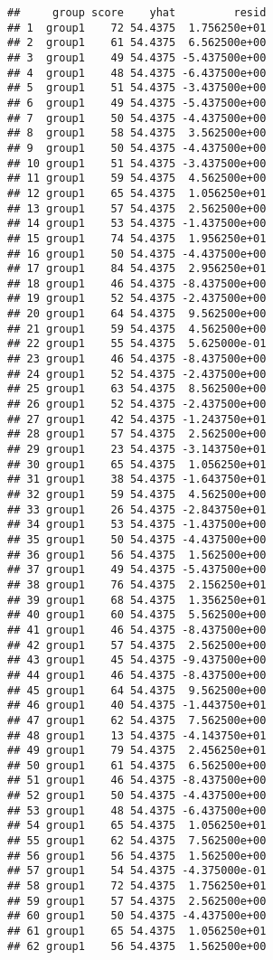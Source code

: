 \documentclass[
]{article}
\begin{document}
\begin{verbatim}
##     group score    yhat         resid
## 1  group1    72 54.4375  1.756250e+01
## 2  group1    61 54.4375  6.562500e+00
## 3  group1    49 54.4375 -5.437500e+00
## 4  group1    48 54.4375 -6.437500e+00
## 5  group1    51 54.4375 -3.437500e+00
## 6  group1    49 54.4375 -5.437500e+00
## 7  group1    50 54.4375 -4.437500e+00
## 8  group1    58 54.4375  3.562500e+00
## 9  group1    50 54.4375 -4.437500e+00
## 10 group1    51 54.4375 -3.437500e+00
## 11 group1    59 54.4375  4.562500e+00
## 12 group1    65 54.4375  1.056250e+01
## 13 group1    57 54.4375  2.562500e+00
## 14 group1    53 54.4375 -1.437500e+00
## 15 group1    74 54.4375  1.956250e+01
## 16 group1    50 54.4375 -4.437500e+00
## 17 group1    84 54.4375  2.956250e+01
## 18 group1    46 54.4375 -8.437500e+00
## 19 group1    52 54.4375 -2.437500e+00
## 20 group1    64 54.4375  9.562500e+00
## 21 group1    59 54.4375  4.562500e+00
## 22 group1    55 54.4375  5.625000e-01
## 23 group1    46 54.4375 -8.437500e+00
## 24 group1    52 54.4375 -2.437500e+00
## 25 group1    63 54.4375  8.562500e+00
## 26 group1    52 54.4375 -2.437500e+00
## 27 group1    42 54.4375 -1.243750e+01
## 28 group1    57 54.4375  2.562500e+00
## 29 group1    23 54.4375 -3.143750e+01
## 30 group1    65 54.4375  1.056250e+01
## 31 group1    38 54.4375 -1.643750e+01
## 32 group1    59 54.4375  4.562500e+00
## 33 group1    26 54.4375 -2.843750e+01
## 34 group1    53 54.4375 -1.437500e+00
## 35 group1    50 54.4375 -4.437500e+00
## 36 group1    56 54.4375  1.562500e+00
## 37 group1    49 54.4375 -5.437500e+00
## 38 group1    76 54.4375  2.156250e+01
## 39 group1    68 54.4375  1.356250e+01
## 40 group1    60 54.4375  5.562500e+00
## 41 group1    46 54.4375 -8.437500e+00
## 42 group1    57 54.4375  2.562500e+00
## 43 group1    45 54.4375 -9.437500e+00
## 44 group1    46 54.4375 -8.437500e+00
## 45 group1    64 54.4375  9.562500e+00
## 46 group1    40 54.4375 -1.443750e+01
## 47 group1    62 54.4375  7.562500e+00
## 48 group1    13 54.4375 -4.143750e+01
## 49 group1    79 54.4375  2.456250e+01
## 50 group1    61 54.4375  6.562500e+00
## 51 group1    46 54.4375 -8.437500e+00
## 52 group1    50 54.4375 -4.437500e+00
## 53 group1    48 54.4375 -6.437500e+00
## 54 group1    65 54.4375  1.056250e+01
## 55 group1    62 54.4375  7.562500e+00
## 56 group1    56 54.4375  1.562500e+00
## 57 group1    54 54.4375 -4.375000e-01
## 58 group1    72 54.4375  1.756250e+01
## 59 group1    57 54.4375  2.562500e+00
## 60 group1    50 54.4375 -4.437500e+00
## 61 group1    65 54.4375  1.056250e+01
## 62 group1    56 54.4375  1.562500e+00

\end{verbatim}
\end{document}

